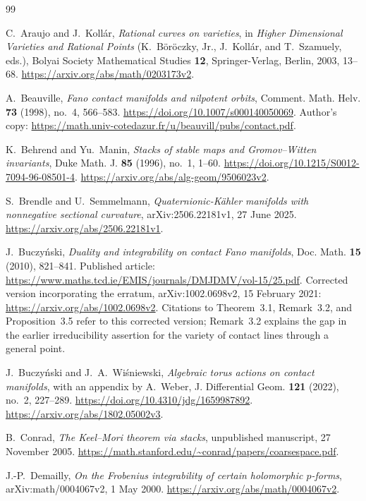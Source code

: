 \begingroup
\small
\begin{thebibliography}{99}

C.~Araujo and J.~Koll\'ar,
\emph{Rational curves on varieties},
in \emph{Higher Dimensional Varieties and Rational Points}
(K.~B\"or\"oczky, Jr., J.~Koll\'ar, and T.~Szamuely, eds.),
Bolyai Society Mathematical Studies \textbf{12},
Springer-Verlag, Berlin, 2003, 13--68.
\url{https://arxiv.org/abs/math/0203173v2}.

A.~Beauville,
\emph{Fano contact manifolds and nilpotent orbits},
Comment. Math. Helv. \textbf{73} (1998), no.~4, 566--583.
\url{https://doi.org/10.1007/s000140050069}.
Author's copy:
\url{https://math.univ-cotedazur.fr/u/beauvill/pubs/contact.pdf}.

K.~Behrend and Yu.~Manin,
\emph{Stacks of stable maps and Gromov--Witten invariants},
Duke Math. J. \textbf{85} (1996), no.~1, 1--60.
\url{https://doi.org/10.1215/S0012-7094-96-08501-4}.
\url{https://arxiv.org/abs/alg-geom/9506023v2}.

S.~Brendle and U.~Semmelmann,
\emph{Quaternionic-K\"ahler manifolds with nonnegative sectional curvature},
arXiv:2506.22181v1, 27 June 2025.
\url{https://arxiv.org/abs/2506.22181v1}.

J.~Buczy\'nski,
\emph{Duality and integrability on contact Fano manifolds},
Doc. Math. \textbf{15} (2010), 821--841.
Published article:
\url{https://www.maths.tcd.ie/EMIS/journals/DMJDMV/vol-15/25.pdf}.
Corrected version incorporating the erratum, arXiv:1002.0698v2,
15 February 2021:
\url{https://arxiv.org/abs/1002.0698v2}.
Citations to Theorem~3.1, Remark~3.2, and Proposition~3.5 refer to this
corrected version; Remark~3.2 explains the gap in the earlier irreducibility
assertion for the variety of contact lines through a general point.

J.~Buczy\'nski and J.~A.~Wi\'sniewski,
\emph{Algebraic torus actions on contact manifolds},
with an appendix by A.~Weber,
J. Differential Geom. \textbf{121} (2022), no.~2, 227--289.
\url{https://doi.org/10.4310/jdg/1659987892}.
\url{https://arxiv.org/abs/1802.05002v3}.

B.~Conrad,
\emph{The Keel--Mori theorem via stacks},
unpublished manuscript, 27 November 2005.
\url{https://math.stanford.edu/~conrad/papers/coarsespace.pdf}.

J.-P.~Demailly,
\emph{On the Frobenius integrability of certain holomorphic $p$-forms},
arXiv:math/0004067v2, 1 May 2000.
\url{https://arxiv.org/abs/math/0004067v2}.


\end{thebibliography}
